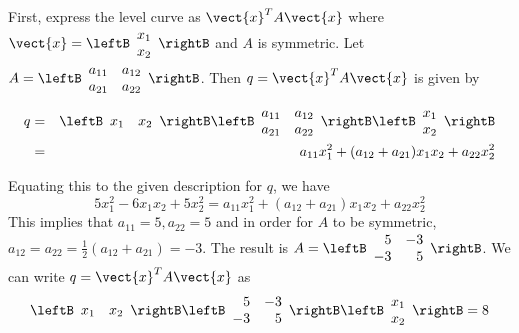 \begin{solution}
First, express the level curve as $\vect{x}^TA\vect{x}$ where $\vect{x} = \leftB
\begin{array}{r}
x_1 \\
x_2 
\end{array}
\rightB$ and $A$ is symmetric. Let $A = \leftB \begin{array}{rr}
a_{11} & a_{12} \\
a_{21} & a_{22}
\end{array} \rightB$. Then $q = \vect{x}^T A \vect{x}$ is given by 
\begin{eqnarray*}
q &=&  \leftB \begin{array}{cc}
x_1 & x_2 
\end{array}
\rightB
\leftB \begin{array}{rr}
a_{11} & a_{12} \\
a_{21} & a_{22}
\end{array} \rightB
\leftB
\begin{array}{r}
x_1 \\
x_2 
\end{array}
\rightB\\
&=& a_{11}x_1^2 + (a_{12} + a_{21})x_1x_2 + a_{22}x_2^2
\end{eqnarray*}
 
Equating this to the given description for $q$, we have 
\[
5x_1^2 -6x_1x_2 + 5x_2^2 =  a_{11}x_1^2 + (a_{12} + a_{21})x_1x_2 + a_{22}x_2^2
\]
This implies that $a_{11} = 5, a_{22} = 5$ and in order for $A$ to be symmetric, $a_{12} = a_{22} = \frac{1}{2} (a_{12}+a_{21}) = -3$. The result is $A = \leftB
\begin{array}{rr}
5 & -3 \\
-3 & 5
\end{array}
\rightB$. We can write $q = \vect{x}^TA\vect{x}$ as 
\begin{equation*}
\leftB
\begin{array}{cc}
x_1 & x_2 
\end{array}
\rightB \leftB
\begin{array}{rr}
5 & -3 \\
-3 & 5
\end{array}
\rightB \leftB
\begin{array}{c}
x_1 \\
x_2
\end{array}
\rightB =8
\end{equation*}


\end{solution}

